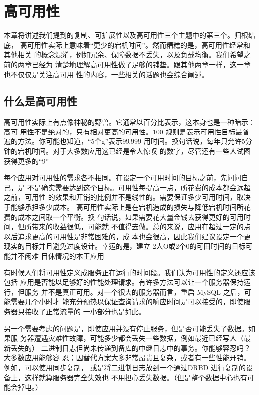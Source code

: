 \chapter{高可用性}
本章将讲述我们提到的复制、可扩展性以及高可用性三个主题中的第三个。归根结底，
高可用性实际上意味着“更少的宕机时间”。然而糟糕的是，高可用性经常和其他相关
的概念混淆，例如冗余、保障数据不丢失，以及负载均衡。我们希望之前的两章已经为
清楚地理解高可用性做了足够的铺垫。跟其他两章一样，这一章也不仅仅是关注高可用
性的内容，一些相关的话题也会综合阐述。

\section{什么是高可用性}
高可用性实际上有点像神秘的野兽。它通常以百分比表示，这本身也是一种暗示：高可
用性不是绝对的，只有相对更高的可用性。100%
规则是表示可用性目标最普遍的方法。你可能也知道，“5个g”表示99.999%
用时间。换句话说，每年只允许5分钟的宕机时间。对于大多数应用这已经是令人惊叹
的数字，尽管还有一些人试图获得更多的“9”

每个应用对可用性的需求各不相同。在设定一个可用时间的目标之前，先问问自己，是
不是确实需要达到这个目标。可用性每提高一点，所花费的成本都会远超之前，可用性
的效果和开销的比例并不是线性的。需要保证多少可用时间，取决于能够承担多少成本。
高可用性实际上是在宕机造成的损失与降低宕机时间所花费的成本之间取一个平衡。换
句话说，如果需要花大量金钱去获得更好的可用时间，但所带来的收益很低，可能就
不值得去做。总的来说，应用在超过一定的点以后追求更高的可用性是非常困难的，成
本也会很高，因此我们建议设定一个更现实的目标并且避免过度设计。幸运的是，建立
2人O或2个0的可田时间的日标可能并不闲难 目休情况的本王应用

有时候人们将可用性定义成服务正在运行的时间段。我们认为可用性的定义还应该包括
应用是否能以足够好的性能处理请求。有许多方法可以让一个服务器保持运行，但服务
并不是真正可用。对一个很大的服务器而言，重启 MySQL 之后，可能需要几个小时才
能充分预热以保证查询请求的响应时间是可以接受的，即使服务器只接收了正常流量的
一小部分也是如此。

另一个需要考虑的问题是，即使应用并没有停止服务，但是否可能丢失了数据。如果服
务器遭遇灾难性故障，可能多少都会丢失一些数据，例如最近已经写人（最新丢失的）
二进制日志但尚未传递到备库的中继日志中的事务。你能够容忍吗？大多数应用能够容
忍；因替代方案大多非常昂贵且复杂，或者有一些性能开销。例如，可以使用同步复制，
或是将二进制日志放到一个通过DRBD 进行复制的设备上，这样就算服务器完全失效也
不用担心丢失数据。（但是整个数据中心也有可能会掉电。）

